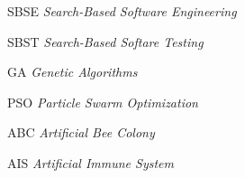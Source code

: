 \begin{siglas}
  \item[SBSE] \textit{Search-Based Software Engineering}
  \item[SBST] \textit{Search-Based Softare Testing}
  \item[GA] \textit{Genetic Algorithms}
  \item[PSO] \textit{Particle Swarm Optimization}
  \item[ABC] \textit{Artificial Bee Colony}
  \item[AIS] \textit{Artificial Immune System}
\end{siglas}
